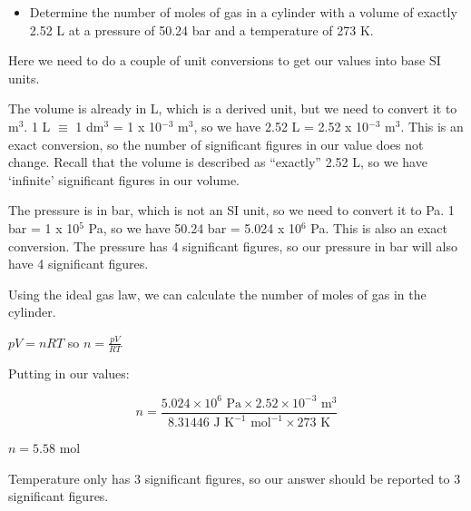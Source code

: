 \documentclass[
  letterpaper,
  DIV=11,
  numbers=noendperiod]{scrreprt}
\providecommand{\tightlist}{%
  \setlength{\itemsep}{0pt}\setlength{\parskip}{0pt}}
\begin{document}
\begin{tcolorbox}[enhanced jigsaw, arc=.35mm, bottomrule=.15mm, bottomtitle=1mm, breakable, colback=white, colbacktitle=quarto-callout-caution-color!10!white, colframe=quarto-callout-caution-color-frame, coltitle=black, left=2mm, leftrule=.75mm, opacityback=0, opacitybacktitle=0.6, rightrule=.15mm, title=\textcolor{quarto-callout-caution-color}{\faFire}\hspace{0.5em}{Example of significant figures in multiplication and division - the
ideal gas law.}, titlerule=0mm, toprule=.15mm, toptitle=1mm]

\begin{itemize}
\tightlist
\item
  Determine the number of moles of gas in a cylinder with a volume of
  exactly 2.52 L at a pressure of 50.24 bar and a temperature of 273 K.
\end{itemize}

Here we need to do a couple of unit conversions to get our values into
base SI units.

The volume is already in L, which is a derived unit, but we need to
convert it to m\(^3\). 1 L \(\equiv\) 1 dm\(^3\) = 1 x 10\(^{-3}\)
m\(^3\), so we have 2.52 L = 2.52 x 10\(^{-3}\) m\(^3\). This is an
exact conversion, so the number of significant figures in our value does
not change. Recall that the volume is described as ``exactly'' 2.52 L,
so we have `infinite' significant figures in our volume.

The pressure is in bar, which is not an SI unit, so we need to convert
it to Pa. 1 bar = 1 x 10\(^5\) Pa, so we have 50.24 bar = 5.024 x
10\(^6\) Pa. This is also an exact conversion. The pressure has 4
significant figures, so our pressure in bar will also have 4 significant
figures.

Using the ideal gas law, we can calculate the number of moles of gas in
the cylinder.

\(pV = nRT\) so \(n = \frac{pV}{RT}\)

Putting in our values:

\[n = \frac{5.024 \times 10^6 \textrm{ Pa} \times 2.52 \times 10^{-3} \textrm{ m}^3}{8.31446 \textrm{ J K}^{-1} \textrm{ mol}^{-1} \times 273 \textrm{ K}}\]

\(n = 5.58 \textrm{ mol}\)

Temperature only has 3 significant figures, so our answer should be
reported to 3 significant figures.

\end{tcolorbox}
\end{document}

